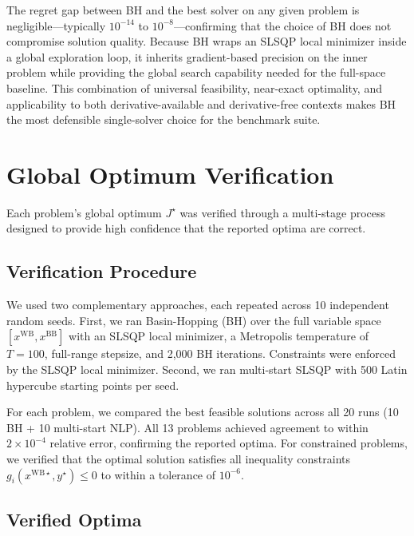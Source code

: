 \documentclass[12pt,a4paper]{article}%
\theoremstyle{plain}%
\theoremstyle{remark}%
\theoremstyle{definition}%
\def\WB{\mathrm{WB}}
\def\BB{\mathrm{BB}}
\begin{document}
\begin{appendices}
The regret gap between BH and the best solver on any given problem is negligible---typically $10^{-14}$ to $10^{-8}$---confirming that the choice of BH does not compromise solution quality. Because BH wraps an SLSQP local minimizer inside a global exploration loop, it inherits gradient-based precision on the inner problem while providing the global search capability needed for the full-space baseline. This combination of universal feasibility, near-exact optimality, and applicability to both derivative-available and derivative-free contexts makes BH the most defensible single-solver choice for the benchmark suite.

\section{Global Optimum Verification}\label{sec:optimum_verification}

Each problem's global optimum $J^\star$ was verified through a multi-stage process designed to provide high confidence that the reported optima are correct.

\subsection{Verification Procedure}\label{subsec:verification_procedure}

We used two complementary approaches, each repeated across 10 independent random seeds. First, we ran Basin-Hopping (BH) over the full variable space $[x^{\WB}, x^{\BB}]$ with an SLSQP local minimizer, a Metropolis temperature of $T=100$, full-range stepsize, and 2{,}000 BH iterations. Constraints were enforced by the SLSQP local minimizer. Second, we ran multi-start SLSQP with 500 Latin hypercube starting points per seed.

For each problem, we compared the best feasible solutions across all 20 runs (10 BH + 10 multi-start NLP). All 13 problems achieved agreement to within $2 \times 10^{-4}$ relative error, confirming the reported optima. For constrained problems, we verified that the optimal solution satisfies all inequality constraints $g_i(x^{\WB\star}, y^\star) \leq 0$ to within a tolerance of $10^{-6}$.

\subsection{Verified Optima}\label{subsec:verified_optima}


\end{appendices}
\end{document}
